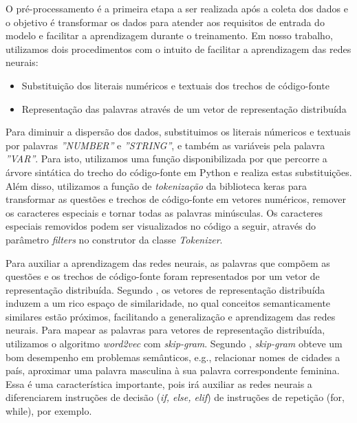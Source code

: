 O pré-processamento é a primeira etapa a ser realizada após a coleta dos dados e o objetivo é transformar os dados para atender aos requisitos de entrada do modelo e facilitar a aprendizagem durante o treinamento. Em nosso trabalho, utilizamos dois procedimentos com o intuito de facilitar a aprendizagem das redes neurais:

\begin{itemize}
    \item Substituição dos literais numéricos e textuais dos trechos de código-fonte
    \item Representação das palavras através de um vetor de representação distribuída
\end{itemize}

Para diminuir a dispersão dos dados, substituimos os literais númericos e textuais por palavras \emph{''NUMBER''} e \emph{''STRING''}, e também as variáveis pela palavra \emph{''VAR''}. Para isto, utilizamos uma função disponibilizada por \cite{yao-2018} que percorre a árvore sintática do trecho do código-fonte em Python e realiza estas substituições. Além disso, utilizamos a função de \textit{tokenização} da biblioteca \Gls{keras} para transformar as questões e trechos de código-fonte em vetores numéricos, remover os caracteres especiais e tornar todas as palavras minúsculas. Os caracteres especiais removidos podem ser visualizados no código a seguir, através do parâmetro \textit{filters} no construtor da classe \textit{Tokenizer}.



Para auxiliar a aprendizagem das redes neurais, as palavras que compõem as questões e os trechos de código-fonte foram representados por um vetor de representação distribuída. Segundo \cite{Goodfellow-et-al-2016:representation-learning}, os vetores de representação distribuída induzem a um rico espaço de similaridade, no qual conceitos semanticamente similares estão próximos, facilitando a generalização e aprendizagem das redes neurais. Para mapear as palavras para vetores de representação distribuída, utilizamos o algoritmo \textit{word2vec} com \textit{skip-gram}. Segundo \cite{mikolov2013distributed}, \textit{skip-gram} obteve um bom desempenho em problemas semânticos, e.g., relacionar nomes de cidades a país, aproximar uma palavra masculina à sua palavra correspondente feminina. Essa é uma característica importante, pois irá auxiliar as redes neurais a diferenciarem instruções de decisão (\textit{if, else, elif}) de instruções de repetição (for, while), por exemplo. 

